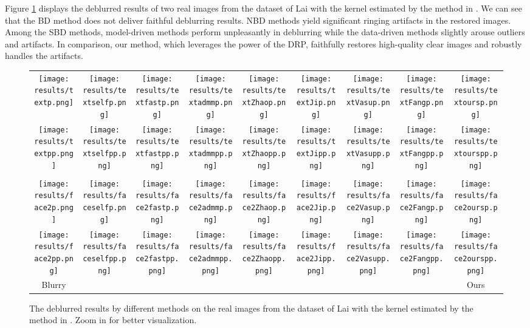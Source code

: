 \documentclass[10pt,twocolumn,letterpaper]{article}
\begin{document}
	Figure \ref{real} displays the deblurred results of two real images from the dataset of Lai \etal\cite{lai2016comparative} with the kernel estimated by the method in \cite{pan2016blind}. We can see that the BD method \cite{ren2020neural} does not deliver faithful deblurring results. NBD methods \cite{krishnan2009fast, ren2015fast} yield significant ringing artifacts in the restored images. Among the SBD methods, model-driven methods  \cite{Zhao2013TotalVS,ji2011robust} perform unpleasantly in deblurring while the data-driven methods \cite{vasu2018non, Fang_2022_CVPR} slightly arouse outliers and artifacts. In comparison, our method, which leverages the power of the DRP, faithfully restores high-quality clear images and robustly handles the artifacts.
	
	\begin{figure}[!t]
		\centering
		\setlength\tabcolsep{1pt}
		\renewcommand{\arraystretch}{0.5} %
		\begin{tabular}{ccccccccc}
			\texttt{[image: results/textp.png]}&
			\texttt{[image: results/textselfp.png]}&
			\texttt{[image: results/textfastp.png]}&
			\texttt{[image: results/textadmmp.png]}&
			\texttt{[image: results/textZhaop.png]}&
			\texttt{[image: results/textJip.png]}&
			\texttt{[image: results/textVasup.png]}&
			\texttt{[image: results/textFangp.png]}&
			\texttt{[image: results/textoursp.png]}\\
			\texttt{[image: results/textpp.png]}&
			\texttt{[image: results/textselfpp.png]}&
			\texttt{[image: results/textfastpp.png]}&
			\texttt{[image: results/textadmmpp.png]}&
			\texttt{[image: results/textZhaopp.png]}&
			\texttt{[image: results/textJipp.png]}&
			\texttt{[image: results/textVasupp.png]}&
			\texttt{[image: results/textFangpp.png]}&
			\texttt{[image: results/textourspp.png]}\\
			\quad\\
			\texttt{[image: results/face2p.png]}&
			\texttt{[image: results/faceselfp.png]}&
			\texttt{[image: results/face2fastp.png]}&
			\texttt{[image: results/face2admmp.png]}&
			\texttt{[image: results/face2Zhaop.png]}&
			\texttt{[image: results/face2Jip.png]}&
			\texttt{[image: results/face2Vasup.png]}&
			\texttt{[image: results/face2Fangp.png]}&
			\texttt{[image: results/face2oursp.png]}\\
			\texttt{[image: results/face2pp.png]}&
			\texttt{[image: results/faceselfpp.png]}&
			\texttt{[image: results/face2fastpp.png]}&
			\texttt{[image: results/face2admmpp.png]}&
			\texttt{[image: results/face2Zhaopp.png]}&
			\texttt{[image: results/face2Jipp.png]}&
			\texttt{[image: results/face2Vasupp.png]}&
			\texttt{[image: results/face2Fangpp.png]}&
			\texttt{[image: results/face2ourspp.png]}\\
			Blurry&\cite{ren2020neural}&\cite{krishnan2009fast}&\cite{ren2015fast}&\cite{Zhao2013TotalVS}&\cite{ji2011robust}&\cite{vasu2018non} &\cite{Fang_2022_CVPR}&Ours
		\end{tabular}
		\caption{The deblurred results by different methods on the real images from the dataset of Lai \etal\cite{lai2016comparative} with the kernel estimated by the method in \cite{pan2016blind}. Zoom in for better visualization.}
		\label{real}
	\end{figure}
\end{document}

